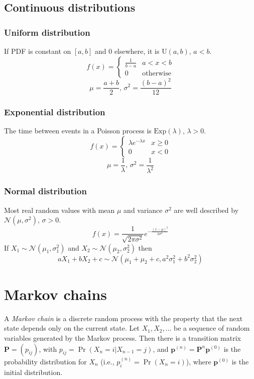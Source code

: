 \subsection{Continuous distributions}
\subsubsection{Uniform distribution}
\raggedright
If PDF is constant on $[a, b]$ and 0 elsewhere, it is $\textrm{U}(a,b),\,a<b$.
\[f(x) = \left\{
\begin{array}{cl}
\frac{1}{b-a} & a<x<b\\
0 & \textrm{otherwise}
\end{array}\right.\]
\[\mu=\frac{a+b}{2},\,\sigma^2=\frac{(b-a)^2}{12}\]

\subsubsection{Exponential distribution}
The time between events in a Poisson process is $\textrm{Exp}(\lambda),\,\lambda>0$.
\[f(x) = \left\{
\begin{array}{cl}
\lambda e^{-\lambda x} & x\geq0\\
0 & x<0
\end{array}\right.\]
\[\mu=\frac{1}{\lambda},\,\sigma^2=\frac{1}{\lambda^2}\]

\subsubsection{Normal distribution}
Most real random values with mean $\mu$ and variance $\sigma^2$ are well described by $\mathcal{N}(\mu,\sigma^2),\,\sigma>0$.
\[ f(x) = \frac{1}{\sqrt{2\pi\sigma^2}}e^{-\frac{(x-\mu)^2}{2\sigma^2}} \]
If $X_1 \sim \mathcal{N}(\mu_1,\sigma_1^2)$ and $X_2 \sim \mathcal{N}(\mu_2,\sigma_2^2)$ then
\[ aX_1 + bX_2 + c \sim \mathcal{N}(\mu_1+\mu_2+c,a^2\sigma_1^2+b^2\sigma_2^2) \]

\section{Markov chains}
A \emph{Markov chain} is a discrete random process with the property that the next state depends only on the current state.
Let $X_1,X_2,\ldots$ be a sequence of random variables generated by the Markov process.
Then there is a transition matrix $\mathbf{P} = (p_{ij})$, with $p_{ij} = \Pr(X_n = i | X_{n-1} = j)$,
and $\mathbf{p}^{(n)} = \mathbf P^n \mathbf p^{(0)}$ is the probability distribution for $X_n$ (i.e., $p^{(n)}_i = \Pr(X_n = i)$),
where $\mathbf{p}^{(0)}$ is the initial distribution.

